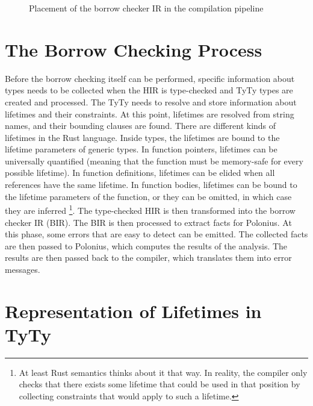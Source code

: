 \documentclass[
  11pt,
  twoside,symmetric]{report}
\begin{document}
\begin{figure}
\centering

\caption{Placement of the borrow checker IR in the compilation pipeline}
\end{figure}

\section{The Borrow Checking Process}\label{the-borrow-checking-process}

Before the borrow checking itself can be performed, specific information
about types needs to be collected when the HIR is type-checked and TyTy
types are created and processed. The TyTy needs to resolve and store
information about lifetimes and their constraints. At this point,
lifetimes are resolved from string names, and their bounding clauses are
found. There are different kinds of lifetimes in the Rust language.
Inside types, the lifetimes are bound to the lifetime parameters of
generic types. In function pointers, lifetimes can be universally
quantified (meaning that the function must be memory-safe for every
possible lifetime). In function definitions, lifetimes can be elided
when all references have the same lifetime. In function bodies,
lifetimes can be bound to the lifetime parameters of the function, or
they can be omitted, in which case they are inferred \footnote{At least
  Rust semantics thinks about it that way. In reality, the compiler only
  checks that there exists some lifetime that could be used in that
  position by collecting constraints that would apply to such a
  lifetime.}. The type-checked HIR is then transformed into the borrow
checker IR (BIR). The BIR is then processed to extract facts for
Polonius. At this phase, some errors that are easy to detect can be
emitted. The collected facts are then passed to Polonius, which computes
the results of the analysis. The results are then passed back to the
compiler, which translates them into error messages.

\section{Representation of Lifetimes in
TyTy}\label{representation-of-lifetimes-in-tyty}
\end{document}
